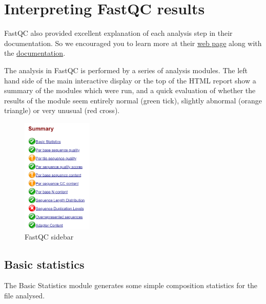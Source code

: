 \documentclass[
  letterpaper,
  DIV=11,
  numbers=noendperiod]{scrreprt}
\begin{document}
\hypertarget{interpreting-fastqc-results}{%
\section{Interpreting FastQC
results}\label{interpreting-fastqc-results}}

FastQC also provided excellent explanation of each analysis step in
their documentation. So we encouraged you to learn more at their
\href{https://www.bioinformatics.babraham.ac.uk/projects/fastqc/}{web
page} along with the
\href{https://www.bioinformatics.babraham.ac.uk/projects/fastqc/Help/}{documentation}.

The analysis in FastQC is performed by a series of analysis modules. The
left hand side of the main interactive display or the top of the HTML
report show a summary of the modules which were run, and a quick
evaluation of whether the results of the module seem entirely normal
(green tick), slightly abnormal (orange triangle) or very unusual (red
cross).

\begin{figure}

{\centering \includegraphics[width=0.3\textwidth,height=\textheight]{./assets/19_fqc_sidebar.png}

}

\caption{FastQC sidebar}

\end{figure}

\hypertarget{basic-statistics}{%
\subsection{Basic statistics}\label{basic-statistics}}

The Basic Statistics module generates some simple composition statistics
for the file analysed.
\end{document}
